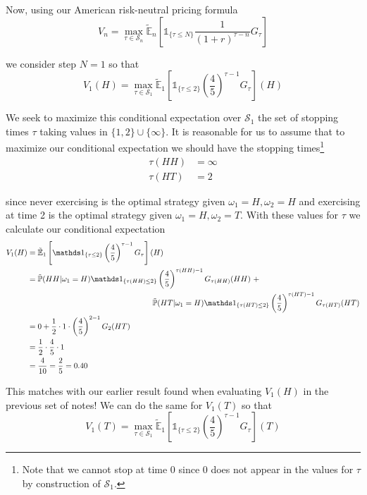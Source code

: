 \documentclass[12pt]{article}
\newlength\tindent
\renewcommand{\indent}{\hspace*{\tindent}}
\renewcommand{\P}{\mathbb P}
\newcommand{\E}{\mathbb E}
\begin{document}
Now, using our American risk-neutral pricing formula
\begin{equation*}
	V_n = \max_{\tau \in \mathcal S_n} \tilde{\E}_n \left[ \mathds 1_{\{\tau \leq N\}} \frac{1}{(1 + r)^{\tau - n}} G_{\tau} \right]
\end{equation*}

we consider step $N = 1$ so that
\begin{equation*}
	V_1(H) = \max_{\tau \in \mathcal S_1} \tilde{\E}_1 \left[ \mathds 1_{\{\tau \leq 2\}} \left(\frac{4}{5}\right)^{\tau - 1} G_{\tau} \right](H)
\end{equation*}

\indent We seek to maximize this conditional expectation over $\mathcal S_1$ the set of stopping times $\tau$ taking values in $\{1,2\}\cup\{\infty\}$. It is reasonable for us to assume that to maximize our conditional expectation we should have the stopping times\footnote{Note that we cannot stop at time 0 since 0 does not appear in the values for $\tau$ by construction of $\mathcal S_1$.}
\begin{align*}
	\tau(HH) &= \infty \\
	\tau(HT) &= 2
\end{align*}

since never exercising is the optimal strategy given $\omega_1 = H, \omega_2 = H$ and exercising at time 2 is the optimal strategy given $\omega_1 = H, \omega_2 = T$. With these values for $\tau$ we calculate our conditional expectation
\begin{align*}
	V_1(H) &= \tilde{\E}_1 \left[ \mathds 1_{\{\tau \leq 2\}} \left(\frac{4}{5}\right)^{\tau - 1} G_{\tau} \right](H) \\
	&= \tilde{\P}(HH|\omega_1 = H)\mathds 1_{\{\tau(HH) \leq 2\}} \left(\frac{4}{5}\right)^{\tau(HH) - 1}G_{\tau(HH)}(HH)~+  \\
	&\hphantom{{}={---------------}} \tilde{\P}(HT|\omega_1 = H)\mathds 1_{\{\tau(HT) \leq 2\}} \left(\frac{4}{5}\right)^{\tau(HT) - 1}G_{\tau(HT)}(HT) \\
	&= 0 + \frac{1}{2}\cdot1\cdot\left(\frac{4}{5}\right)^{2 - 1}G_2(HT) \\
	&= \frac{1}{2}\cdot\frac{4}{5}\cdot1 \\
	&= \frac{4}{10} = \frac{2}{5} = 0.40
\end{align*}

\indent This matches with our earlier result found when evaluating $V_1(H)$ in the previous set of notes! We can do the same for $V_1(T)$ so that
\begin{equation*}
	V_1(T) = \max_{\tau \in \mathcal S_1} \tilde{\E}_1 \left[ \mathds 1_{\{\tau \leq 2\}} \left(\frac{4}{5}\right)^{\tau - 1} G_{\tau} \right](T)
\end{equation*}
\end{document}
